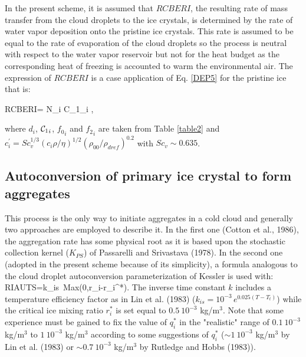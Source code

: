 In the present scheme, it is assumed that $RCBERI$, the resulting rate of mass
transfer from the cloud droplets to the ice crystals, is determined by the rate
of water vapor deposition onto the pristine ice crystals. This rate is assumed
to be equal to the rate of evaporation of the cloud droplets so the process is
neutral with respect to the water vapor reservoir but not for the heat budget
as the corresponding heat of freezing is accounted to warm the environmental
air. The expression of $RCBERI$ is a case application of Eq. \ref{DEP5} for the
pristine ice that is:

\be\label{BER1}
RCBERI=\frac{\displaystyle{4\pi}}{\displaystyle{\rho}}
    N_i {{\cal C}_1}_i
    ,
\ee

\noindent where $d_i$, ${{\cal C}_1}_i$, ${{f}_0}_i$ and ${{f}_2}_i$ are taken
from Table \ref{table2} and
$c^\prime_i=Sc_{v}^{1/3}(c_i \rho/\eta)^{1/2}(\rho_{00}/\rho_{dref})^{0.2}$ with
$Sc_{v} \sim 0.635$.

%
\subsection{Autoconversion of primary ice crystal to form aggregates}
%
This process is the only way to initiate aggregates in a cold cloud and
generally two approaches are employed to describe it. In the first one
(Cotton et al., 1986), the aggregation rate has some physical root as it is
based upon the stochastic collection kernel ($K_{PS}$) of Passarelli and
Srivastava (1978). In the second one (adopted in the present scheme because of
its simplicity), a formula analogous to the cloud droplet autoconversion
parameterization of Kessler is used with:
%
\be\label{AU1}
RIAUTS=k_{is}\ Max(0,r_i-r_i^*).
\ee
%
\noindent The inverse time constant $k$ includes a temperature efficiency
factor as in Lin et al. (1983) ($k_{is}=10^{-3}\,e^{0.025(T-T_t)}$) while the
critical ice mixing ratio $r_i^*$ is set equal to $0.5\ 10^{-3}$
kg/m$^3$. Note that some experience must be gained to fix the value of
$q_i^*$ in the "realistic" range of $0.1\ 10^{-3}$ kg/m$^3$ to
$1\ 10^{-3}$ kg/m$^3$ according to some suggestions of $q_i^*$
($\sim 1\ 10^{-3}$ kg/m$^3$ by Lin et al. (1983) or $\sim 0.7\ 10^{-3}$ kg/m$^3$
by Rutledge and Hobbs (1983)).

